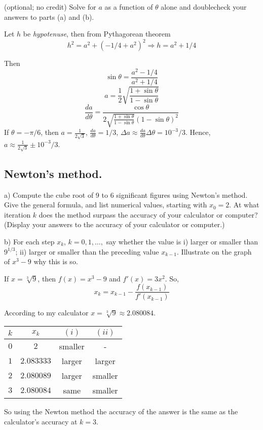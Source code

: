 \documentclass{article}
\begin{document}
\begin{tcolorbox}
    (optional; no credit) Solve for $a$ as a function of $\theta$ alone and doublecheck your answers to parts (a) and (b).
\end{tcolorbox}
Let $h$ be \textit{hypotenuse}, then from Pythagorean theorem
\[ h^2 = a^2 + \left(-1/4 + a^2\right)^2 \Rightarrow h = a^2 + 1/4\]

Then
\[ \sin{\theta} = \frac{a^2 - 1/4}{a^2 + 1/4} \]
\[ a = \frac{1}{2}\sqrt{\frac{1 + \sin{\theta}}{1-\sin{\theta}}} \]
\[ \frac{da}{d\theta} = \frac{\cos{\theta}}{2\sqrt{\frac{1 + \sin{\theta}}{1 - \sin{\theta}}}(1 - \sin{\theta})^2} \]
If $\theta = -\pi/6$, then $a = \frac{1}{2\sqrt{3}}$, $\frac{da}{d\theta} = 1/3$, $\Delta a \approx \frac{da}{d\theta}\Delta \theta = 10^{-3}/3$. Hence, $a \approx \frac{1}{2\sqrt{3}} \pm 10^{-3}/3$.

\newpage
\subsection{Newton’s method.}
\begin{tcolorbox}
    a) Compute the cube root of 9 to 6 significant figures using Newton’s method. Give the general formula, and list numerical values, starting with $x_0 = 2$. At what iteration $k$ does the method surpass the accuracy of your calculator or computer? (Display your answers to the accuracy of your calculator or computer.)
    \par b) For each step $x_k$, $k = 0, 1, \dots,$ say whether the value is i) larger or smaller than $9^{1/3}$; ii) larger or smaller than the preceding value $x_{k-1}$. Illustrate on the graph of $x^3 - 9$ why this is so.
\end{tcolorbox}
If $x = \sqrt[3]{9}$, then $f(x) = x^3-9$ and $f'(x) = 3x^2$. So,
\[ x_k = x_{k-1} - \frac{f(x_{k-1})}{f'(x_{k-1})} \]

According to my calculator $x = \sqrt[3]{9} \approx 2.080084$.
\begin{center}
\begin{tabular}{|c|c|c|c|}
    \hline
    $k$ & $x_k$ & $(i)$ & $(ii)$ \\ \hline
    $0$ & $2$ & smaller & - \\ \hline
    $1$ & $2.083333$ & larger & larger \\ \hline
    $2$ & $2.080089$ & larger & smaller \\ \hline
    $3$ & $2.080084$ & same & smaller \\ \hline
\end{tabular}
\end{center}
So using the Newton method the accuracy of the answer is the same as the calculator's accuracy at $k = 3$.
\end{document}
